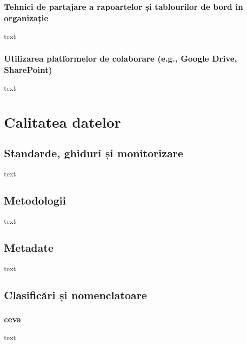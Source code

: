 \documentclass[
  11pt,
  b5paper,
  nottoc]{book}
\begin{document}
\subsection{Tehnici de partajare a rapoartelor și tablourilor de bord în
organizație}\label{tehnici-de-partajare-a-rapoartelor-ux219i-tablourilor-de-bord-uxeen-organizaux21bie}

text

\subsection{Utilizarea platformelor de colaborare (e.g., Google Drive,
SharePoint)}\label{utilizarea-platformelor-de-colaborare-e.g.-google-drive-sharepoint}

text


\chapter{Calitatea datelor}\label{cap9}

\section{Standarde, ghiduri și
monitorizare}\label{standarde-ghiduri-ux219i-monitorizare}

text

\section{Metodologii}\label{metodologii}

text

\section{Metadate}\label{metadate}

text

\section{Clasificări și
nomenclatoare}\label{clasificux103ri-ux219i-nomenclatoare}

\subsection{ceva}\label{ceva}

text
\end{document}
